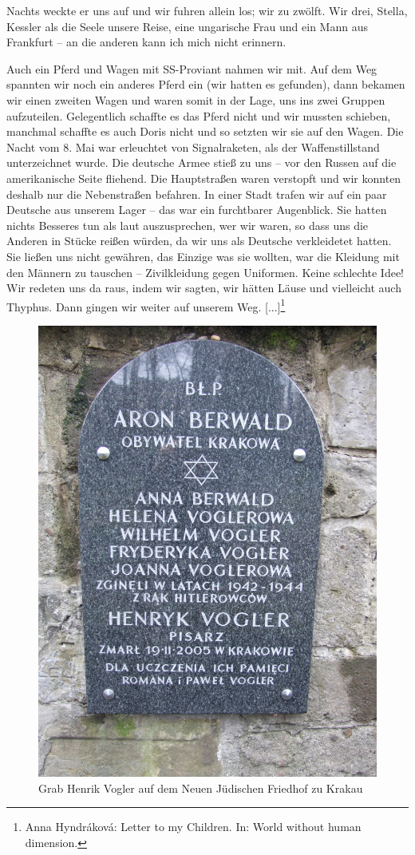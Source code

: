 Nachts weckte er uns auf und wir fuhren allein los; wir zu zwölft. Wir drei, Stella, Kessler als die Seele unsere Reise, eine ungarische Frau und ein Mann aus Frankfurt -- an die anderen kann ich mich nicht erinnern. 

Auch ein Pferd und Wagen mit SS-Proviant nahmen wir mit. Auf dem Weg spannten wir noch ein anderes Pferd ein (wir hatten es gefunden), dann bekamen wir einen zweiten Wagen und waren somit in der Lage, uns ins zwei Gruppen aufzuteilen. Gelegentlich schaffte es das Pferd nicht und wir mussten schieben, manchmal schaffte es auch Doris nicht und so setzten wir sie auf den Wagen. Die Nacht vom 8. Mai war erleuchtet von Signalraketen, als der Waffenstillstand unterzeichnet wurde. Die deutsche Armee stieß zu uns -- vor den Russen auf die amerikanische Seite fliehend. Die Hauptstraßen waren verstopft und wir konnten deshalb nur die Nebenstraßen befahren. In einer Stadt trafen wir auf ein paar Deutsche aus unserem Lager -- das war ein furchtbarer Augenblick. Sie hatten nichts Besseres tun als laut auszusprechen, wer wir waren, so dass uns die Anderen in Stücke reißen würden, da wir uns als Deutsche verkleidetet hatten. Sie ließen uns nicht gewähren, das Einzige was sie wollten, war die Kleidung mit den Männern zu tauschen -- Zivilkleidung gegen Uniformen. Keine schlechte Idee! Wir redeten uns da raus, indem wir sagten, wir hätten Läuse und vielleicht auch Thyphus. Dann gingen wir weiter auf unserem Weg. [...]\footnote{Anna Hyndr\'akov\'a: Letter to my Children. In: World without human dimension.}

\begin{figure}[htb]
    \includegraphics[width=.6\linewidth]{images/nk_vogler}
    \caption{Grab Henrik Vogler auf dem Neuen Jüdischen Friedhof zu Krakau}
    \label{voglergrab}
\end{figure}

